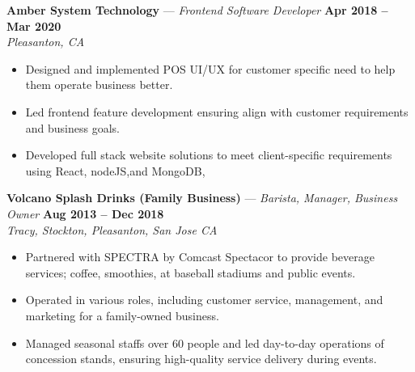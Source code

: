 \documentclass[letterpaper,11pt]{article}
\begin{document}
\textbf{Amber System Technology} — \textit{Frontend Software Developer} \hfill \textbf{Apr 2018 -- Mar 2020} \\
\textit{Pleasanton, CA}
\begin{itemize}
    \item Designed and implemented POS UI/UX for customer specific need to help them operate business better.
    \item Led frontend feature development ensuring align with customer requirements and business goals.
    \item Developed full stack website solutions to meet client-specific requirements using React, nodeJS,and MongoDB,
\end{itemize}
\textbf{Volcano Splash Drinks (Family Business)} — \textit{Barista, Manager, Business Owner} \hfill \textbf{Aug 2013 -- Dec 2018} \\
\textit{Tracy, Stockton, Pleasanton, San Jose CA}
\begin{itemize}
    \item Partnered with SPECTRA by Comcast Spectacor to provide beverage services; coffee, smoothies, at baseball stadiums and public events.
    \item Operated in various roles, including customer service, management, and marketing for a family-owned business.
    \item Managed seasonal staffs over 60 people and led day-to-day operations of concession stands, ensuring high-quality service delivery during events.
\end{itemize}
\end{document}
